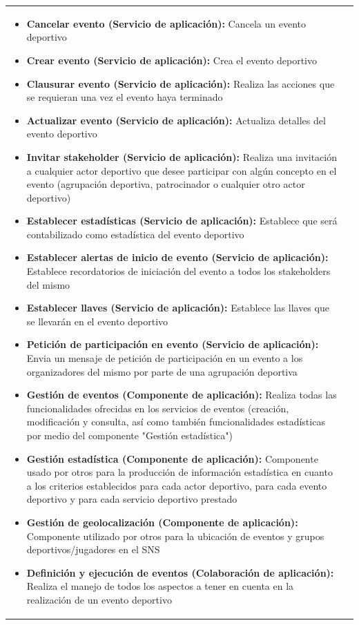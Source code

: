 \begin{table}[!htb]
\begin{center}
{\begin{tabular}{|p{7cm}|p{4cm}|}
\begin{itemize}
				\item \textbf{Cancelar evento (Servicio de aplicación):} Cancela un evento deportivo
				\item \textbf{Crear evento (Servicio de aplicación):} Crea el evento deportivo
				\item \textbf{Clausurar evento (Servicio de aplicación):} Realiza las acciones que se requieran una vez el evento haya terminado
				\item \textbf{Actualizar evento (Servicio de aplicación):} Actualiza detalles del evento deportivo
				\item \textbf{Invitar stakeholder (Servicio de aplicación):} Realiza una invitación a cualquier actor deportivo que desee participar con algún concepto en el evento (agrupación deportiva, patrocinador o cualquier otro actor deportivo)
				\item \textbf{Establecer estadísticas (Servicio de aplicación):} Establece que será contabilizado como estadística del evento deportivo
				\item \textbf{Establecer alertas de inicio de evento (Servicio de aplicación):} Establece recordatorios de iniciación del evento a todos los stakeholders del mismo
				\item \textbf{Establecer llaves (Servicio de aplicación):} Establece las llaves que se llevarán en el evento deportivo
				\item \textbf{Petición de participación en evento (Servicio de aplicación):} Envia un mensaje de petición de participación en un evento a los organizadores del mismo por parte de una agrupación deportiva
				\item \textbf{Gestión de eventos (Componente de aplicación):} Realiza todas las funcionalidades ofrecidas en los servicios de eventos (creación, modificación y consulta, así como también funcionalidades estadísticas por medio del componente "Gestión estadística")
				\item \textbf{Gestión estadística (Componente de aplicación):} Componente usado por otros para la producción de información estadística en cuanto a los criterios establecidos para cada actor deportivo, para cada evento deportivo y para cada servicio deportivo prestado
				\item \textbf{Gestión de geolocalización (Componente de aplicación):} Componente utilizado por otros para la ubicación de eventos y grupos deportivos/jugadores en el SNS
				\item \textbf{Definición y ejecución de eventos (Colaboración de aplicación):} Realiza el manejo de todos los aspectos a tener en cuenta en la realización de un evento deportivo

\end{itemize}
\end{tabular}}
\end{center}
\end{table}
